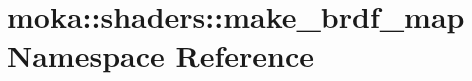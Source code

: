 \hypertarget{namespacemoka_1_1shaders_1_1make__brdf__map}{}\section{moka\+::shaders\+::make\+\_\+brdf\+\_\+map Namespace Reference}
\label{namespacemoka_1_1shaders_1_1make__brdf__map}
